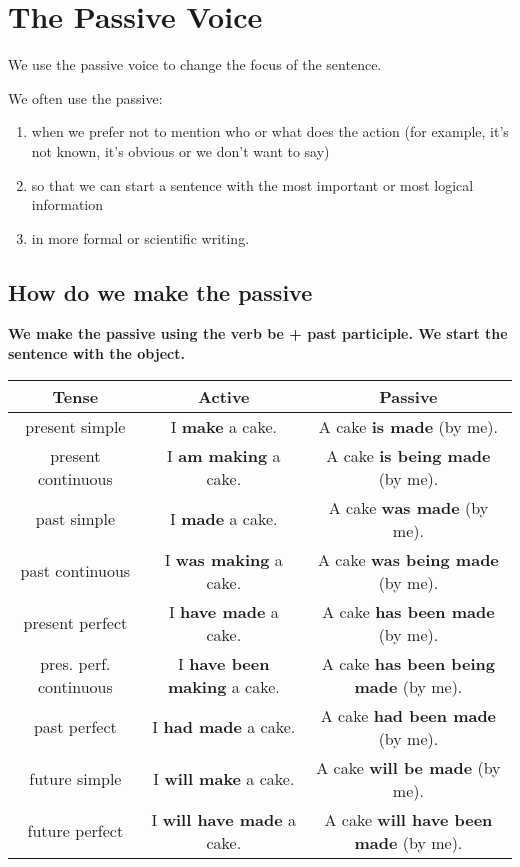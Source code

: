 \documentclass{article}
\begin{document}
\pagebreak
\section{The Passive Voice}

We use the passive voice to change the focus of the sentence.

We often use the passive:

\begin{enumerate}
	\item when we prefer not to mention who or what does the action (for example, it's not known, it's obvious or we don't want to say)
	\item so that we can start a sentence with the most important or most logical information
	\item in more formal or scientific writing.
\end{enumerate}

\subsection{How do we make the passive}

\textbf{We make the passive using the verb be + past participle. We start the sentence with the object.
}

\begin{center}
\begin{tabular}{||c c c||} 
 \hline
 Tense & Active & Passive \\ [0.5ex] 
 \hline\hline
 present simple & I \textbf{make} a cake. & A cake \textbf{is made} (by me).  \\ 
 \hline
 present continuous & I \textbf{am making} a cake. & A cake \textbf{is being made} (by me).  \\
 \hline
 past simple & I \textbf{made} a cake. & A cake \textbf{was made} (by me).  \\
 \hline
 past continuous & I \textbf{was making} a cake. & A cake \textbf{was being made} (by me).  \\
 \hline
 present perfect & I \textbf{have made} a cake. & A cake \textbf{has been made} (by me).  \\
 \hline
 pres. perf. continuous & I \textbf{have been making} a cake. & A cake \textbf{has been being made} (by me).  \\
 \hline
 past perfect & I \textbf{had made} a cake. & A cake \textbf{had been made} (by me).  \\
 \hline
 future simple & I \textbf{will make} a cake. & A cake \textbf{will be made} (by me).  \\
 \hline
 future perfect & I \textbf{will have made} a cake. & A cake \textbf{will have been made} (by me).  \\ [1ex] 
 \hline
\end{tabular}
\end{center}
\end{document}
